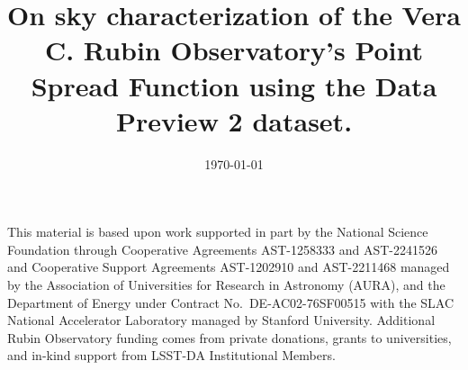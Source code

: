 \documentclass[modern, linenumbers, amsmath]{aastex701}
\begin{document}

\date{\today}
\title{On sky characterization of the Vera C. Rubin Observatory's Point Spread Function using the Data Preview 2 dataset.}







\begin{acknowledgments}
This material is based upon work supported in part by the National Science Foundation through Cooperative Agreements AST-1258333 and AST-2241526 and Cooperative Support Agreements AST-1202910 and AST-2211468 managed by the Association of Universities for Research in Astronomy (AURA), and the Department of Energy under Contract No.\ DE-AC02-76SF00515 with the SLAC National Accelerator Laboratory managed by Stanford University.
Additional Rubin Observatory funding comes from private donations, grants to universities, and in-kind support from LSST-DA Institutional Members.
\end{acknowledgments}

%

\vspace{5mm}

\end{document}
